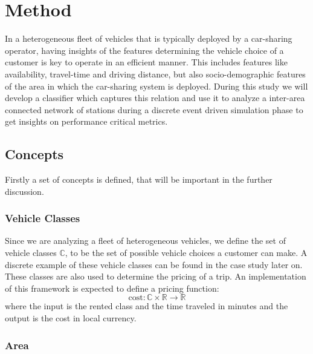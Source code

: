 \clearpage
\section{Method}
\label{sec:Method}

In a heterogeneous fleet of vehicles that is typically deployed by a car-sharing operator,
having insights of the features determining the vehicle choice of a customer is key
to operate in an efficient manner. This includes features like availability, travel-time
and driving distance, but also socio-demographic features of the area in which the
car-sharing system is deployed. During this study we will develop a classifier which 
captures this relation and use it to analyze a inter-area connected network of stations
during a discrete event driven simulation phase to get insights on performance critical
metrics.

\subsection{Concepts}
\label{sub_sec:Method/Concepts}

Firstly a set of concepts is defined, that will be important in the further discussion.

\subsubsection{Vehicle Classes}
\label{sub_sec:Method/Concepts/Classes}

Since we are analyzing a fleet of heterogeneous vehicles, we define the set of vehicle
classes $\mathbb{C}$, to be the set of possible vehicle choices a customer can make. A
discrete example of these vehicle classes can be found in the case study later on. These
classes are also used to determine the pricing of a trip. An implementation of this
framework is expected to define a pricing function:
$$
\text{cost}: \mathbb{C} \times  \mathbb{R} \to \mathbb{R}
$$
where the input is the rented class and the time traveled in minutes and the output is the
cost in local currency.

\subsubsection{Area}
\label{sub_sec:Method/Concepts/Area}


